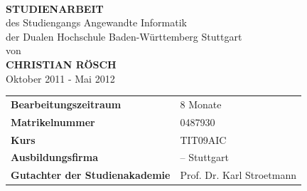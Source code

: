 \thispagestyle{empty}

\parbox[t]{\paperwidth}{}
\begin{center}
	\vspace{15mm}	{\LARGE\bf\thema}\\
	\vspace{20mm}	{\Large\bf STUDIENARBEIT}\\
	\vspace{15mm}	des Studiengangs Angewandte Informatik\\der Dualen Hochschule Baden-Württemberg Stuttgart\\
	\vspace{7,5mm}	von\\
	\vspace{7,5mm}	{\bf CHRISTIAN RÖSCH}\\
	\vspace{10mm}	Oktober 2011 - Mai 2012
	\vspace{30mm}
\end{center}
\begin{longtable}{p{}p{}}
	\textbf{Bearbeitungszeitraum}				&  8 Monate\\
	\textbf{Matrikelnummer}						&  0487930\\
	\textbf{Kurs}								&  TIT09AIC\\
	\textbf{Ausbildungsfirma}					&  \icon{} -- Stuttgart\\
	\textbf{Gutachter der Studienakademie}	& Prof. Dr. Karl Stroetmann  \\
\end{longtable}